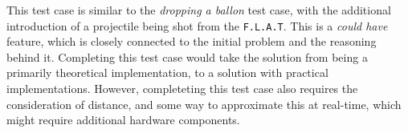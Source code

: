 This test case is similar to the \textit{dropping a ballon} test case, with the additional introduction of a projectile being shot from the \texttt{F.L.A.T}.
This is a \textit{could have} feature, which is closely connected to the initial problem and the reasoning behind it.
Completing this test case would take the solution from being a primarily theoretical implementation, to a solution with practical implementations.
However, completeting this test case also requires the consideration of distance, and some way to approximate this at real-time, which might require additional hardware components.